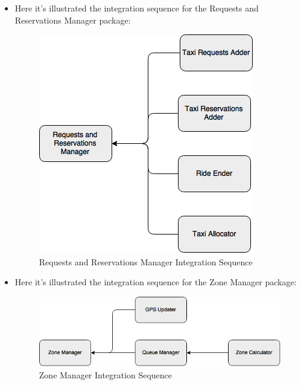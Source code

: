 \documentclass[../../../../../../testPlan.tex]{subfiles}
\begin{document}
\begin{itemize}
\begin{itemize}
						\item Here it's illustrated the integration sequence for the Requests and Reservations Manager package:
							\begin{figure}[H]
								\centering
								\includegraphics[width=\textwidth, scale=0.5]{../images/priority_requestsReservationManager.png}
								\caption{Requests and Reservations Manager Integration Sequence}\label{fig:RRManagerSequence}
							\end{figure}

						\item Here it's illustrated the integration sequence for the Zone Manager package:
							\begin{figure}[H]
								\centering
								\includegraphics[width=\textwidth, scale=0.5]{../images/priority_zoneManager.png}
								\caption{Zone Manager Integration Sequence}\label{fig:ZoneManagerSequence}
							\end{figure}
					\end{itemize}


\end{itemize}
\end{document}
